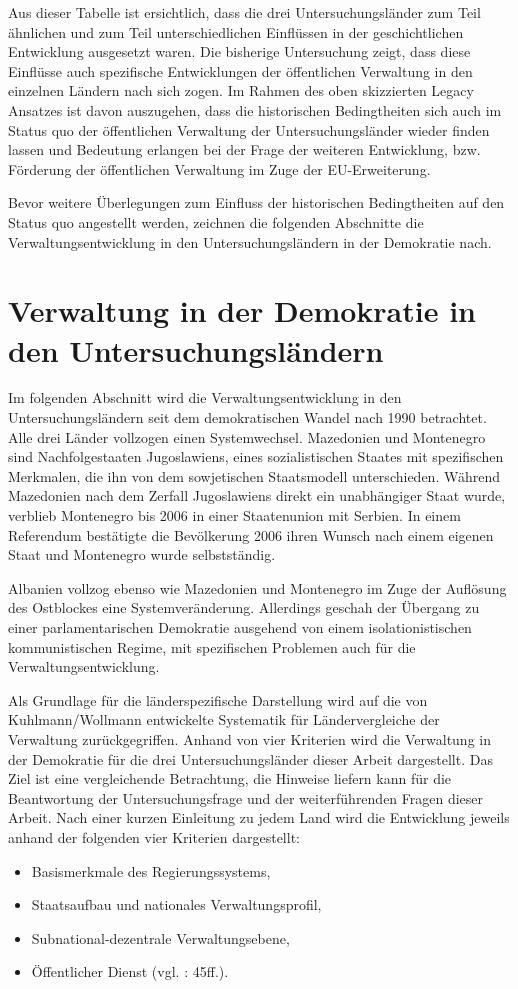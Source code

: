 Aus dieser Tabelle ist ersichtlich, dass die drei Untersuchungsländer zum Teil ähnlichen und zum Teil unterschiedlichen Einflüssen in der geschichtlichen Entwicklung ausgesetzt waren. Die bisherige Untersuchung zeigt, dass diese Einflüsse auch spezifische Entwicklungen der öffentlichen Verwaltung in den einzelnen Ländern nach sich zogen. Im Rahmen des oben skizzierten Legacy Ansatzes ist davon auszugehen, dass die historischen Bedingtheiten sich auch im Status quo der öffentlichen Verwaltung der Untersuchungsländer wieder finden lassen und Bedeutung erlangen bei der Frage der weiteren Entwicklung, bzw. Förderung der öffentlichen Verwaltung im Zuge der EU-Erweiterung.\par
Bevor weitere Überlegungen zum Einfluss der historischen Bedingtheiten auf den Status quo angestellt werden, zeichnen die folgenden Abschnitte die Verwaltungsentwicklung in den Untersuchungsländern in der Demokratie nach. 

\section{Verwaltung in der Demokratie in den Untersuchungsländern}
Im folgenden Abschnitt wird die Verwaltungsentwicklung in den Untersuchungsländern seit dem demokratischen Wandel nach 1990 betrachtet. Alle drei Länder vollzogen einen Systemwechsel. Mazedonien und Montenegro sind Nachfolgestaaten Jugoslawiens, eines sozialistischen Staates mit spezifischen Merkmalen, die ihn von dem sowjetischen Staatsmodell unterschieden. Während Mazedonien nach dem Zerfall Jugoslawiens direkt ein unabhängiger Staat wurde, verblieb Montenegro bis 2006 in einer Staatenunion mit Serbien. In einem Referendum bestätigte die Bevölkerung 2006 ihren Wunsch nach einem eigenen Staat und Montenegro wurde selbstständig.\par
Albanien vollzog ebenso wie Mazedonien und Montenegro im Zuge der Auflösung des Ostblockes eine Systemveränderung. Allerdings geschah der Übergang zu einer parlamentarischen Demokratie ausgehend von einem isolationistischen kommunistischen Regime, mit spezifischen Problemen auch für die Verwaltungsentwicklung.\par
Als Grundlage für die länderspezifische Darstellung wird auf die von Kuhlmann/Wollmann entwickelte Systematik für Ländervergleiche der Verwaltung zurückgegriffen. Anhand von vier Kriterien wird die Verwaltung in der Demokratie für die drei Untersuchungsländer dieser Arbeit dargestellt. Das Ziel ist eine vergleichende Betrachtung, die Hinweise liefern kann für die Beantwortung der Untersuchungsfrage und der weiterführenden Fragen dieser Arbeit. Nach einer kurzen Einleitung zu jedem Land wird die Entwicklung jeweils anhand der folgenden vier Kriterien dargestellt:
\begin{itemize} \itemsep1pt \parskip0pt 
\item Basismerkmale des Regierungssystems,
\item Staatsaufbau und nationales Verwaltungsprofil,
\item Subnational-dezentrale Verwaltungsebene,
\item Öffentlicher Dienst (vgl. \cite{kuhwol}: 45ff.).
\end{itemize}
